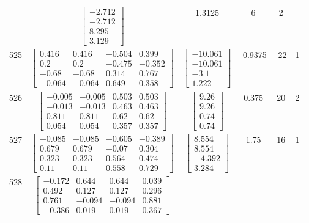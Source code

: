 \documentclass[a4paper,12pt]{article}
\begin{document}
\begin{tabular}{c c c c c c}
&
$\begin{bmatrix} -2.712 \\ -2.712 \\ 8.295 \\ 3.129 \end{bmatrix}$
&
1.3125
&
6
&
2
\\
525
&
$\begin{bmatrix} 0.416 & 0.416 & -0.504 & 0.399 \\ 0.2 & 0.2 & -0.475 & -0.352 \\ -0.68 & -0.68 & 0.314 & 0.767 \\ -0.064 & -0.064 & 0.649 & 0.358 \end{bmatrix}$
&
$\begin{bmatrix} -10.061 \\ -10.061 \\ -3.1 \\ 1.222 \end{bmatrix}$
&
-0.9375
&
-22
&
1
\\
526
&
$\begin{bmatrix} -0.005 & -0.005 & 0.503 & 0.503 \\ -0.013 & -0.013 & 0.463 & 0.463 \\ 0.811 & 0.811 & 0.62 & 0.62 \\ 0.054 & 0.054 & 0.357 & 0.357 \end{bmatrix}$
&
$\begin{bmatrix} 9.26 \\ 9.26 \\ 0.74 \\ 0.74 \end{bmatrix}$
&
0.375
&
20
&
2
\\
527
&
$\begin{bmatrix} -0.085 & -0.085 & -0.605 & -0.389 \\ 0.679 & 0.679 & -0.07 & 0.304 \\ 0.323 & 0.323 & 0.564 & 0.474 \\ 0.11 & 0.11 & 0.558 & 0.729 \end{bmatrix}$
&
$\begin{bmatrix} 8.554 \\ 8.554 \\ -4.392 \\ 3.284 \end{bmatrix}$
&
1.75
&
16
&
1
\\
528
&
$\begin{bmatrix} -0.172 & 0.644 & 0.644 & 0.039 \\ 0.492 & 0.127 & 0.127 & 0.296 \\ 0.761 & -0.094 & -0.094 & 0.881 \\ -0.386 & 0.019 & 0.019 & 0.367 \end{bmatrix}$

\end{tabular}
\end{document}
